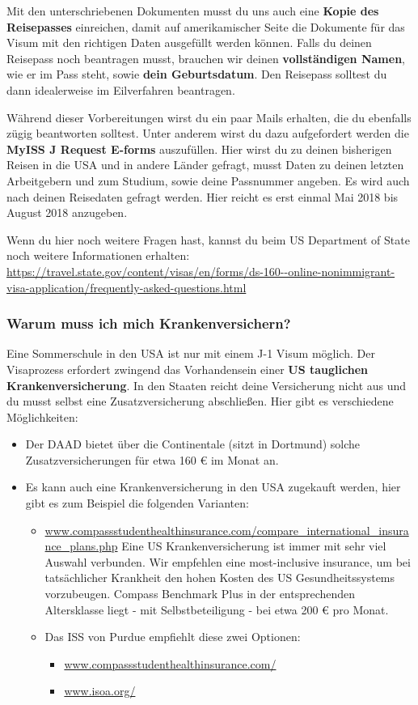 \documentclass[
  paper=a4,
  fontsize=12pt,
  DIV=16,
  headheight=52pt,
  footheight=45pt,
  headinclude,
  parskip=full,
]{scrartcl}
\begin{document}
Mit den unterschriebenen Dokumenten musst du uns auch eine
\textbf{Kopie des Reisepasses} einreichen, damit auf amerikamischer Seite die
Dokumente für das Visum mit den richtigen Daten ausgefüllt werden können.
Falls du deinen Reisepass noch beantragen musst, brauchen wir deinen
\textbf{vollständigen Namen}, wie er im Pass steht, sowie \textbf{dein
Geburtsdatum}. Den Reisepass solltest du dann idealerweise im Eilverfahren
beantragen.

Während dieser Vorbereitungen wirst du ein paar Mails erhalten, die du
ebenfalls zügig beantworten solltest.
Unter anderem wirst du dazu aufgefordert werden die
\textbf{MyISS J Request E-forms} auszufüllen.
Hier wirst du zu deinen bisherigen Reisen in die USA und in andere Länder
gefragt, musst Daten zu deinen letzten Arbeitgebern und zum Studium, sowie
deine Passnummer angeben.
Es wird auch nach deinen Reisedaten gefragt werden. Hier reicht es erst einmal
Mai 2018 bis August 2018 anzugeben.

Wenn du hier noch weitere Fragen hast, kannst du beim US Department of State
noch weitere Informationen erhalten:
\url{https://travel.state.gov/content/visas/en/forms/ds-160--online-nonimmigrant-visa-application/frequently-asked-questions.html}

\subsubsection*{Warum muss ich mich Krankenversichern?}
Eine Sommerschule in den USA ist nur mit einem J-1 Visum möglich.
Der Visaprozess erfordert zwingend das Vorhandensein einer
\textbf{US tauglichen Krankenversicherung}.
In den Staaten reicht deine Versicherung nicht aus und du musst selbst eine
Zusatzversicherung abschließen.
Hier gibt es verschiedene Möglichkeiten:
\begin{itemize}
  \item Der DAAD bietet über die Continentale (sitzt in Dortmund) solche
  Zusatzversicherungen für etwa 160 € im Monat an.
  \item Es kann auch eine Krankenversicherung in den USA zugekauft werden, hier
  gibt es zum Beispiel die folgenden Varianten:
  \begin{itemize}
    \item \url{www.compassstudenthealthinsurance.com/compare_international_insurance_plans.php}
    Eine US Krankenversicherung ist immer mit sehr viel Auswahl verbunden.
    Wir empfehlen eine most-inclusive insurance, um bei tatsächlicher Krankheit
    den hohen Kosten des US Gesundheitssystems vorzubeugen.
    Compass Benchmark Plus in der entsprechenden Altersklasse liegt - mit
    Selbstbeteiligung - bei etwa 200 € pro Monat.
    \item Das ISS von Purdue empfiehlt diese zwei Optionen:
    \begin{itemize}
      \item \url{www.compassstudenthealthinsurance.com/}
      \item \url{www.isoa.org/}
    \end{itemize}
  \end{itemize}
\end{itemize}
\end{document}
